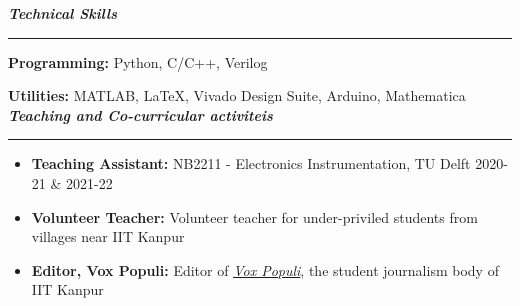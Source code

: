 \documentclass[11pt,a4paper]{article}
\begin{document}
\color{myBlue}
\noindent \Large\textbf{\textit{Technical Skills}} \vspace{0.15cm}
\hrule \normalsize
\color{black} \vspace{0.3cm}
\textbf{Programming:} Python, C/C++, Verilog

\textbf{Utilities:} MATLAB, \LaTeX, Vivado Design Suite, Arduino, Mathematica \\

\color{myBlue}
\noindent \Large\textbf{\textit{Teaching and Co-curricular activiteis}} \vspace{0.15cm}
\hrule \normalsize
\color{black} \vspace{0.3cm}
\begin{itemize}
  \item \textbf{Teaching Assistant:} NB2211 - Electronics Instrumentation, TU Delft \hfill 2020-21 \& 2021-22\vspace{-0.17cm}
  \item \textbf{Volunteer Teacher:} Volunteer teacher for under-priviled students from villages near IIT Kanpur \vspace{-0.17cm}
  \item \textbf{Editor, Vox Populi:} Editor of \href{https://voxiitk.com/}{\textit{Vox Populi}}, the student journalism body of IIT Kanpur
\end{itemize}
\end{document}

